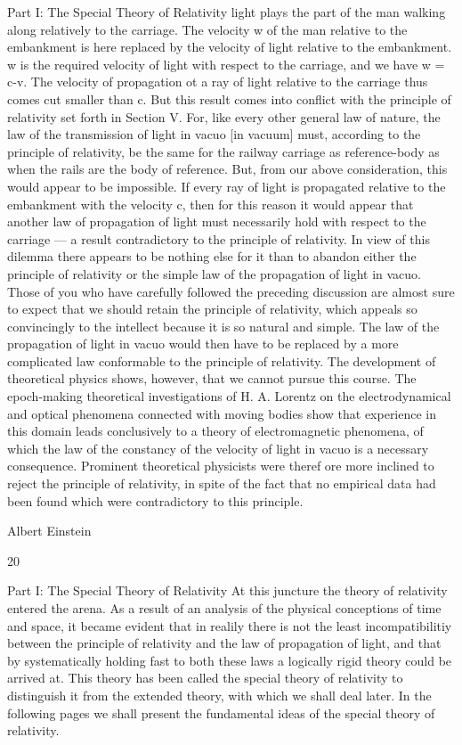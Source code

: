 \documentclass{article}
\begin{document}
Part I: The Special Theory of Relativity
light plays the part of the man walking along relatively to the carriage. The velocity w of
the man relative to the embankment is here replaced by the velocity of light relative to the
embankment. w is the required velocity of light with respect to the carriage, and we have
w = c-v.
The velocity of propagation ot a ray of light relative to the carriage thus comes cut
smaller than c.
But this result comes into conflict with the principle of relativity set forth in Section V.
For, like every other general law of nature, the law of the transmission of light in vacuo [in
vacuum] must, according to the principle of relativity, be the same for the railway carriage
as reference-body as when the rails are the body of reference. But, from our above
consideration, this would appear to be impossible. If every ray of light is propagated
relative to the embankment with the velocity c, then for this reason it would appear that
another law of propagation of light must necessarily hold with respect to the carriage — a
result contradictory to the principle of relativity.
In view of this dilemma there appears to be nothing else for it than to abandon either the
principle of relativity or the simple law of the propagation of light in vacuo. Those of you
who have carefully followed the preceding discussion are almost sure to expect that we
should retain the principle of relativity, which appeals so convincingly to the intellect
because it is so natural and simple. The law of the propagation of light in vacuo would then
have to be replaced by a more complicated law conformable to the principle of relativity.
The development of theoretical physics shows, however, that we cannot pursue this course.
The epoch-making theoretical investigations of H. A. Lorentz on the electrodynamical and
optical phenomena connected with moving bodies show that experience in this domain
leads conclusively to a theory of electromagnetic phenomena, of which the law of the
constancy of the velocity of light in vacuo is a necessary consequence. Prominent
theoretical physicists were theref ore more inclined to reject the principle of relativity, in
spite of the fact that no empirical data had been found which were contradictory to this
principle.

Albert Einstein

20

Part I: The Special Theory of Relativity
At this juncture the theory of relativity entered the arena. As a result of an analysis of the
physical conceptions of time and space, it became evident that in realily there is not the
least incompatibilitiy between the principle of relativity and the law of propagation of light,
and that by systematically holding fast to both these laws a logically rigid theory could be
arrived at. This theory has been called the special theory of relativity to distinguish it from
the extended theory, with which we shall deal later. In the following pages we shall present
the fundamental ideas of the special theory of relativity.
\end{document}
